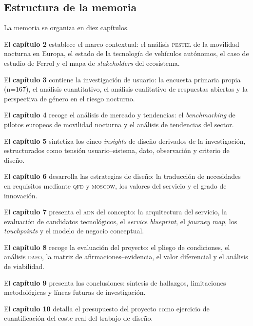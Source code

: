 \subsection{Estructura de la memoria}
\label{sec:estructura}

La memoria se organiza en diez capítulos.

El \textbf{capítulo 2} establece el marco contextual: el análisis \textsc{pestel} de la movilidad nocturna en Europa, el estado de la tecnología de vehículos autónomos, el caso de estudio de Ferrol y el mapa de \textit{stakeholders} del ecosistema.

El \textbf{capítulo 3} contiene la investigación de usuario: la encuesta primaria propia (n=167), el análisis cuantitativo, el análisis cualitativo de respuestas abiertas y la perspectiva de género en el riesgo nocturno.

El \textbf{capítulo 4} recoge el análisis de mercado y tendencias: el \textit{benchmarking} de pilotos europeos de movilidad nocturna y el análisis de tendencias del sector.

El \textbf{capítulo 5} sintetiza los cinco \textit{insights} de diseño derivados de la investigación, estructurados como tensión usuario--sistema, dato, observación y criterio de diseño.

El \textbf{capítulo 6} desarrolla las estrategias de diseño: la traducción de necesidades en requisitos mediante \textsc{qfd} y \textsc{moscow}, los valores del servicio y el grado de innovación.

El \textbf{capítulo 7} presenta el \textsc{adn} del concepto: la arquitectura del servicio, la evaluación de candidatos tecnológicos, el \textit{service blueprint}, el \textit{journey map}, los \textit{touchpoints} y el modelo de negocio conceptual.

El \textbf{capítulo 8} recoge la evaluación del proyecto: el pliego de condiciones, el análisis \textsc{dafo}, la matriz de afirmaciones--evidencia, el valor diferencial y el análisis de viabilidad.

El \textbf{capítulo 9} presenta las conclusiones: síntesis de hallazgos, limitaciones metodológicas y líneas futuras de investigación.

El \textbf{capítulo 10} detalla el presupuesto del proyecto como ejercicio de cuantificación del coste real del trabajo de diseño.
